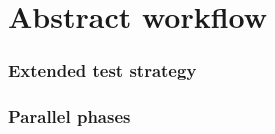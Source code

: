 \section{Abstract workflow}\label{sec:abstract-workflow}


\subsubsection{Extended test strategy}

\subsubsection{Parallel phases}

